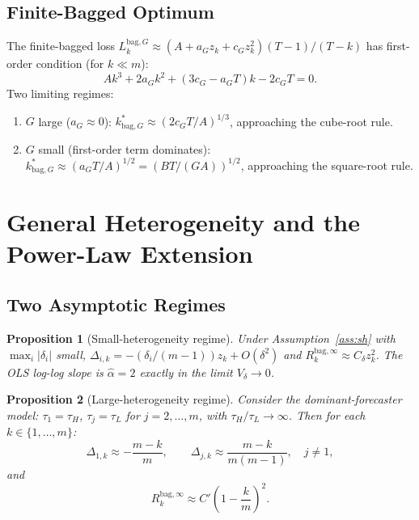 \documentclass[12pt,a4paper]{article}
\newtheorem{proposition}{Proposition}
\theoremstyle{definition}
\begin{document}
\subsection{Finite-Bagged Optimum}

The finite-bagged loss $L_k^{\mathrm{bag},G}\approx(A+a_Gz_k+c_Gz_k^2)(T-1)/(T-k)$
has first-order condition (for $k\ll m$):
\begin{equation}
Ak^3 + 2a_Gk^2 + (3c_G-a_GT)k - 2c_GT = 0.
\end{equation}
Two limiting regimes:
\begin{enumerate}[nosep]
\item $G$ large ($a_G\approx 0$): $k^*_{\mathrm{bag},G}\approx(2c_GT/A)^{1/3}$,
  approaching the cube-root rule.
\item $G$ small (first-order term dominates): $k^*_{\mathrm{bag},G}\approx(a_GT/A)^{1/2}
  =(BT/(GA))^{1/2}$, approaching the square-root rule.
\end{enumerate}

\section{General Heterogeneity and the Power-Law Extension}
\label{sec:powerlaw}

\subsection{Two Asymptotic Regimes}

\begin{proposition}[Small-heterogeneity regime]\label{prop:smallhet2}
Under Assumption~\ref{ass:sh} with $\max_i|\delta_i|$ small,
$\Delta_{i,k}=-(\delta_i/(m-1))z_k+O(\delta^2)$
and $R_k^{\mathrm{bag},\infty}\approx C_\delta z_k^2$.
The OLS log-log slope is $\hat\alpha=2$ exactly in the limit $V_\delta\to 0$.
\end{proposition}

\begin{proposition}[Large-heterogeneity regime]\label{prop:largehet}
Consider the dominant-forecaster model: $\tau_1=\tau_H$,
$\tau_j=\tau_L$ for $j=2,\ldots,m$, with $\tau_H/\tau_L\to\infty$.
Then for each $k\in\{1,\ldots,m\}$:
\begin{equation}
\Delta_{1,k} \approx -\frac{m-k}{m}, \qquad
\Delta_{j,k} \approx \frac{m-k}{m(m-1)},\quad j\neq 1,
\end{equation}
and
\begin{equation}\label{eq:Rbag_large}
R_k^{\mathrm{bag},\infty} \approx C'\!\left(1-\frac{k}{m}\right)^{\!2}.
\end{equation}
\end{proposition}
\end{document}
